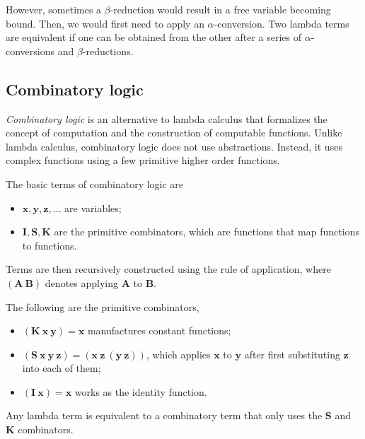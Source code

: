 However, sometimes a $\beta$-reduction would result in a free variable becoming
bound. Then, we would first need to apply an $\alpha$-conversion. Two lambda
terms are equivalent if one can be obtained from the other after a series of
$\alpha$-conversions and $\beta$-reductions.

\subsection{Combinatory logic}

\textit{Combinatory logic} \citep{curry1958combinatory} is an alternative to
lambda calculus that formalizes the concept of computation and the construction
of computable functions. Unlike lambda calculus, combinatory logic does not use
abstractions. Instead, it uses complex functions using a few primitive higher
order functions.

The basic terms of combinatory logic are
\begin{itemize}
  \item $\bm{x},\bm{y},\bm{z},\ldots$ are variables;
  \item $\mathbf{I},\mathbf{S},\mathbf{K}$ are the primitive combinators, which
    are functions that map functions to functions.
\end{itemize}

Terms are then recursively constructed using the rule of application, where
$(\mathbf{A} \: \mathbf{B})$ denotes applying $\mathbf{A}$ to $\mathbf{B}$.

The following are the primitive combinators,
\begin{itemize}
  \item $(\mathbf{K} \: \bm{x} \: \bm{y}) = \bm{x}$ manufactures constant functions;
  \item $(\mathbf{S} \: \bm{x} \: \bm{y} \: \bm{z}) = (\bm{x} \: \bm{z} \:
    (\bm{y} \: \bm{z}))$, which applies $\bm{x}$ to $\bm{y}$ after first substituting
    $\bm{z}$ into each of them;
  \item $(\mathbf{I} \: \bm{x}) = \bm{x}$ works as the identity
    function.
\end{itemize}
Any lambda term is equivalent to a combinatory term that only uses the
$\mathbf{S}$ and $\mathbf{K}$ combinators.

